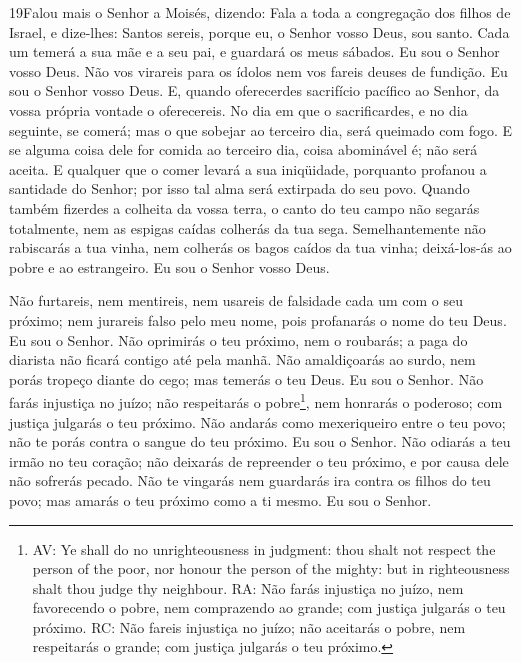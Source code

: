 \medskip

\lettrine{19} Falou mais o Senhor a Moisés, dizendo: Fala
a toda a congregação dos filhos de Israel, e dize-lhes: Santos
sereis, porque eu, o Senhor vosso Deus, sou santo. Cada um
temerá a sua mãe e a seu pai, e guardará os meus sábados. Eu sou o
Senhor vosso Deus. Não vos virareis para os ídolos nem vos
fareis deuses de fundição. Eu sou o Senhor vosso Deus. E, quando
oferecerdes sacrifício pacífico ao Senhor, da vossa própria vontade
o oferecereis. No dia em que o sacrificardes, e no dia seguinte,
se comerá; mas o que sobejar ao terceiro dia, será queimado com
fogo. E se alguma coisa dele for comida ao terceiro dia, coisa
abominável é; não será aceita. E qualquer que o comer levará a
sua iniqüidade, porquanto profanou a santidade do Senhor; por isso
tal alma será extirpada do seu povo. Quando também fizerdes a
colheita da vossa terra, o canto do teu campo não segarás
totalmente, nem as espigas caídas colherás da tua sega.
Semelhantemente não rabiscarás a tua vinha, nem colherás os
bagos caídos da tua vinha; deixá-los-ás ao pobre e ao estrangeiro.
Eu sou o Senhor vosso Deus.

Não furtareis, nem mentireis, nem usareis de falsidade cada um
com o seu próximo; nem jurareis falso pelo meu nome, pois
profanarás o nome do teu Deus. Eu sou o Senhor. Não oprimirás o
teu próximo, nem o roubarás; a paga do diarista não ficará contigo
até pela manhã. Não amaldiçoarás ao surdo, nem porás tropeço
diante do cego; mas temerás o teu Deus. Eu sou o Senhor. Não
farás injustiça no juízo; não respeitarás o pobre\footnote{AV: Ye
shall do no unrighteousness in judgment: thou shalt not respect the
person of the poor, nor honour the person of the mighty: but in
righteousness shalt thou judge thy neighbour. RA: Não farás
injustiça no juízo, nem favorecendo o pobre, nem comprazendo ao
grande; com justiça julgarás o teu próximo. RC: Não fareis injustiça
no juízo; não aceitarás o pobre, nem respeitarás o grande; com
justiça julgarás o teu próximo.}, nem honrarás o poderoso; com
justiça julgarás o teu próximo. Não andarás como mexeriqueiro
entre o teu povo; não te porás contra o sangue do teu próximo. Eu
sou o Senhor. Não odiarás a teu irmão no teu coração; não
deixarás de repreender o teu próximo, e por causa dele não sofrerás
pecado. Não te vingarás nem guardarás ira contra os filhos do
teu povo; mas amarás o teu próximo como a ti mesmo. Eu sou o Senhor.

